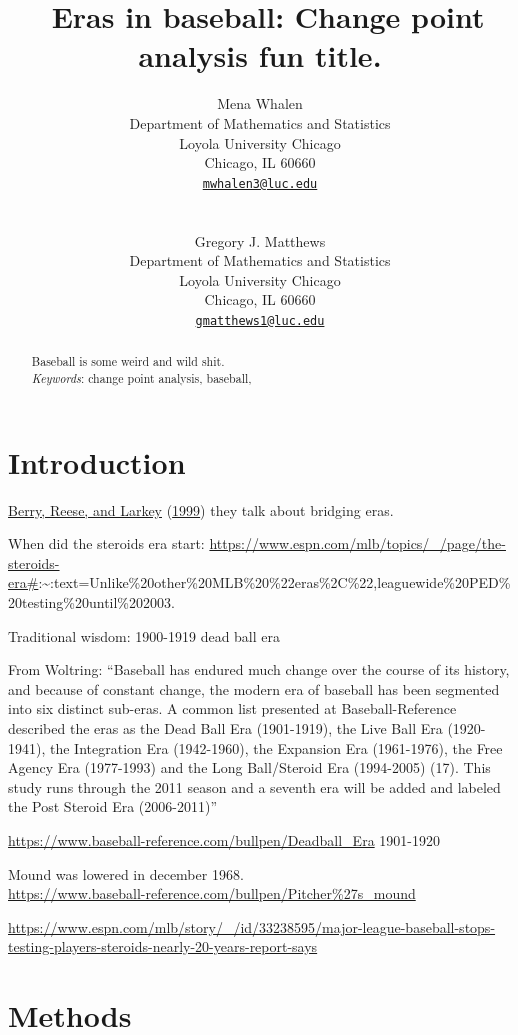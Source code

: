 \documentclass[
  12pt,
]{article}
\title{~\Large Eras in baseball: Change point analysis fun title.}
\author{\large Mena Whalen \vspace{-1.1mm}\\
\normalsize Department of Mathematics and Statistics \vspace{-1mm}\\
\normalsize Loyola University Chicago \vspace{-1mm}\\
\normalsize Chicago, IL 60660 \vspace{-1mm}\\
\normalsize \href{mailto:mwhalen3@luc.edu}{\texttt{mwhalen3@luc.edu}}
\vspace{-1mm}\\
\strut \\
\large Gregory J. Matthews \vspace{-1.1mm}\\
\normalsize Department of Mathematics and Statistics \vspace{-1mm}\\
\normalsize Loyola University Chicago \vspace{-1mm}\\
\normalsize Chicago, IL 60660 \vspace{-1mm}\\
\normalsize \href{mailto:gmatthews1@luc.edu}{\texttt{gmatthews1@luc.edu}}
\vspace{-1mm}}
\date{}
\begin{document}
\maketitle
\begin{abstract}
Baseball is some weird and wild shit. \vspace{2mm}\\
\emph{Keywords}: change point analysis, baseball,
\end{abstract}

\newpage

\hypertarget{sec:intro}{%
\section{Introduction}\label{sec:intro}}

\protect\hyperlink{ref-Berry1999bridging}{Berry, Reese, and Larkey}
(\protect\hyperlink{ref-Berry1999bridging}{1999}) they talk about
bridging eras.

When did the steroids era start:
\url{https://www.espn.com/mlb/topics/_/page/the-steroids-era\#}:\textasciitilde:text=Unlike\%20other\%20MLB\%20\%22eras\%2C\%22,leaguewide\%20PED\%20testing\%20until\%202003.

Traditional wisdom: 1900-1919 dead ball era

From Woltring: ``Baseball has endured much change over the course of its
history, and because of constant change, the modern era of baseball has
been segmented into six distinct sub-eras. A common list presented at
Baseball-Reference described the eras as the Dead Ball Era (1901-1919),
the Live Ball Era (1920-1941), the Integration Era (1942-1960), the
Expansion Era (1961-1976), the Free Agency Era (1977-1993) and the Long
Ball/Steroid Era (1994-2005) (17). This study runs through the 2011
season and a seventh era will be added and labeled the Post Steroid Era
(2006-2011)''

\url{https://www.baseball-reference.com/bullpen/Deadball_Era} 1901-1920

Mound was lowered in december 1968.\\
\url{https://www.baseball-reference.com/bullpen/Pitcher\%27s_mound}

\url{https://www.espn.com/mlb/story/_/id/33238595/major-league-baseball-stops-testing-players-steroids-nearly-20-years-report-says}

\hypertarget{methods}{%
\section{Methods}\label{methods}}
\end{document}

